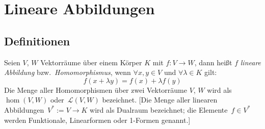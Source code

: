 

\chapter{\label{chap:lineare-abbildungen}Lineare Abbildungen}



\section{Definitionen}

Seien $V$, $W$ Vektorräume über einem Körper $K$ mit $f:V\to W$, dann heißt $f$ \emph{lineare Abbildung} bzw.~\emph{Homomorphismus},
wenn $\forall x,y\in V$ und $\forall\lambda\in K$ gilt:
\[ f(x+\lambda y)=f(x)+\lambda f(y) \]
Die Menge aller Homomorphismen über zwei Vektorräume $V$, $W$ wird als~$\hom(V,W)$ oder~$\mathcal L(V, W)$ bezeichnet.
[Die Menge aller linearen Abbildungen~$V^* := V \to K$ wird als Dualraum bezeichnet; die Elemente~$f \in V^*$ werden Funktionale, Linearformen oder 1-Formen genannt.]
